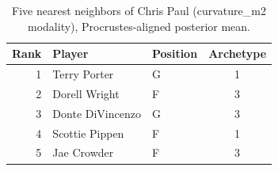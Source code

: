 \begin{table}[htbp]
  \centering\small
  \begin{tabular}{rllc}
    \toprule
    Rank & Player & Position & Archetype \\
    \midrule
    1 & Terry Porter & G & 1 \\
    2 & Dorell Wright & F & 3 \\
    3 & Donte DiVincenzo & G & 3 \\
    4 & Scottie Pippen & F & 1 \\
    5 & Jae Crowder & F & 3 \\
    \bottomrule
  \end{tabular}
  \caption{Five nearest neighbors of Chris Paul (curvature_m2 modality), Procrustes-aligned posterior mean.}
  \label{tab:Chris_Paul_neighbors_curvature_m2}
\end{table}

